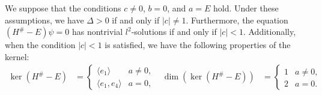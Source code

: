 \documentclass[10pt,a4paper]{amsart}
\begin{document}
\begin{lem}\label{lem:6.5}
We suppose that the conditions \(c \neq 0\), \(b = 0\), and \(a = E\) hold. Under these assumptions, we have \(\Delta > 0\) if and only if \(|c| \neq 1\). Furthermore, the equation \((H^\# - E)\psi = 0\) has nontrivial \(l^2\)-solutions if and only if \(|c| < 1\). Additionally, when the condition \(|c| < 1\) is satisfied, we have the following properties of the kernel:
\begin{align*}
\ker(H^\# - E) &=
\begin{cases}
\langle e_1 \rangle & a \neq 0, \\
\langle e_1, e_4 \rangle & a = 0,
\end{cases}
&
\dim(\ker(H^\# - E)) &=
\begin{cases}
1 & a \neq 0, \\
2 & a = 0.
\end{cases}
\end{align*}
\end{lem}
\end{document}
